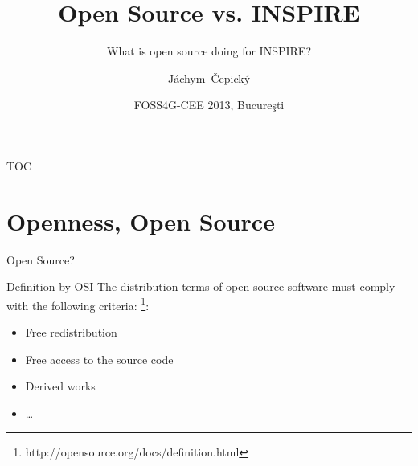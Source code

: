 \documentclass[xcolor=dvipsnames]{beamer}
\title[Open Source] %
{Open Source vs. INSPIRE}
\subtitle {What is open source doing for INSPIRE?}
\author[J. Čepický] %
{Jáchym~Čepický\inst{1}}
\institute %
{
  \inst{1}%
  Help Service - Remote Sensing s.r.o. \\
  Benešov\\
  \url{http://hsrs.cz}\\
  \
}
\date[] %
{FOSS4G-CEE 2013, Bucure\c{s}ti}
\begin{document}
\begin{frame}
  \titlepage
\end{frame}

\begin{frame}{TOC}
  \tableofcontents
\end{frame}





\section{Openness, Open Source}

\begin{frame}{Open Source?}

\begin{block}{Definition by OSI}
    The distribution terms of open-source software must comply with the following criteria: \footnote{http://opensource.org/docs/definition.html}:
    \begin{itemize} 
        \item Free redistribution 
        \item Free access to the source code
        \item Derived works
        \item \dots
    \end{itemize}
\end{block}
\end{frame}
\end{document}
